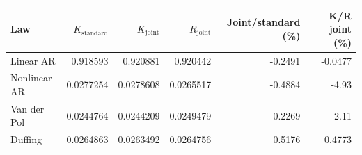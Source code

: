\begin{tabular}{@{}lrrrrr@{}}
\toprule
Law & $K_{\mathrm{standard}}$ & $K_{\mathrm{joint}}$ & $R_{\mathrm{joint}}$ & Joint/standard (\%) & K/R joint (\%) \\
\midrule
Linear AR & 0.918593 & 0.920881 & 0.920442 & -0.2491 & -0.0477 \\
Nonlinear AR & 0.0277254 & 0.0278608 & 0.0265517 & -0.4884 & -4.93 \\
Van der Pol & 0.0244764 & 0.0244209 & 0.0249479 & 0.2269 & 2.11 \\
Duffing & 0.0264863 & 0.0263492 & 0.0264756 & 0.5176 & 0.4773 \\
\bottomrule
\end{tabular}

